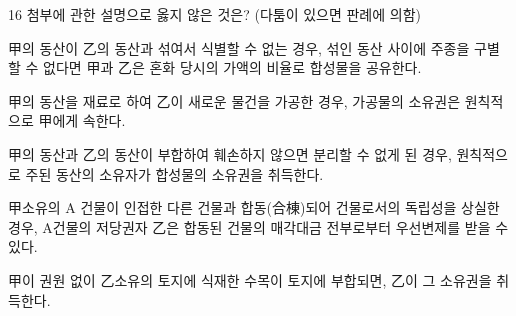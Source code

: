 \begin{question}{16}
첨부에 관한 설명으로 옳지 않은 것은? (다툼이 있으면 판례에 의함)
\begin{choices}
  \item 甲의 동산이 乙의 동산과 섞여서 식별할 수 없는 경우, 섞인 동산 사이에 주종을 구별할 수 없다면 甲과 乙은 혼화 당시의 가액의 비율로 합성물을 공유한다.
  \item 甲의 동산을 재료로 하여 乙이 새로운 물건을 가공한 경우, 가공물의 소유권은 원칙적으로 甲에게 속한다.
  \item 甲의 동산과 乙의 동산이 부합하여 훼손하지 않으면 분리할 수 없게 된 경우, 원칙적으로 주된 동산의 소유자가 합성물의 소유권을 취득한다.
  \item 甲소유의 A 건물이 인접한 다른 건물과 합동(合棟)되어 건물로서의 독립성을 상실한 경우, A건물의 저당권자 乙은 합동된 건물의 매각대금 전부로부터 우선변제를 받을 수 있다.
  \item 甲이 권원 없이 乙소유의 토지에 식재한 수목이 토지에 부합되면, 乙이 그 소유권을 취득한다.
\end{choices}
\end{question}
